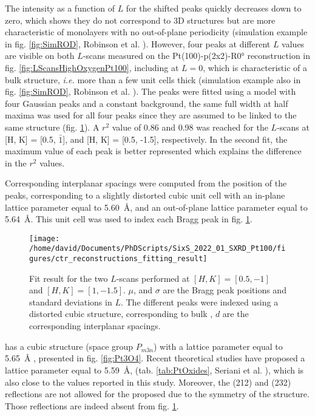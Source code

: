 The intensity as a function of $L$ for the shifted peaks quickly decreases down to zero, which shows they do not correspond to 3D structures but are more characteristic of monolayers with no out-of-plane periodicity (simulation example in fig. \ref{fig:SimROD}, Robinson et al. \cite*{Robinson1991}).
However, four peaks at different $L$ values are visible on both $L$-scans measured on the Pt(100)-p(2x2)-R\ang{0} reconstruction in fig. \ref{fig:LScansHighOxygenPt100}, including at $L=0$, which is characteristic of a bulk structure, \textit{i.e.} more than a few unit cells thick (simulation example also in fig. \ref{fig:SimROD}, Robinson et al. \cite*{Robinson1991}).
The peaks were fitted using a model with four Gaussian peaks and a constant background, the same full width at half maxima was used for all four peaks since they are assumed to be linked to the same structure (fig. \ref{fig:FitPt100LScans}).
A $r^2$ value of \num{0.86} and \num{0.98} was reached for the $L$-scans at [H, K] = [0.5, $\bar{1}$], and [H, K] = [0.5, -1.5], respectively.
In the second fit, the maximum value of each peak is better represented which explains the difference in the $r^2$ values.

Corresponding interplanar spacings were computed from the position of the peaks, corresponding to a slightly distorted cubic unit cell with an in-plane lattice parameter equal to \qty{5.60}{\angstrom}, and an out-of-plane lattice parameter equal to \qty{5.64}{\angstrom}.
This unit cell was used to index each Bragg peak in fig. \ref{fig:FitPt100LScans}.

\begin{figure}[!htb]
    \centering
    \texttt{[image: /home/david/Documents/PhDScripts/SixS\_2022\_01\_SXRD\_Pt100/figures/ctr\_reconstructions\_fitting\_result]}
    \caption{
        Fit result for the two $L$-scans performed at $[H, K] = [0.5, -1]$ and $[H, K] = [1, -1.5]$.
        $\mu$, and $\sigma$ are the Bragg peak positions and standard deviations in $L$.
        The different peaks were indexed using a distorted cubic structure, corresponding to bulk , $d$ are the corresponding interplanar spacings.
    }
    \label{fig:FitPt100LScans}
\end{figure}

 has a cubic structure (space group $P_{m\bar{3}n}$) with a lattice parameter equal to \qty{5.65}{\angstrom} \parencite{Galloni1941, Galloni1952, Muller1968}, presented in fig. \ref{fig:Pt3O4}.
Recent theoretical studies have proposed a lattice parameter equal to \qty{5.59}{\angstrom}, (tab. \ref{tab:PtOxides}, Seriani et al. \cite*{Seriani2006}), which is also close to the values reported in this study.
Moreover, the (212) and (232) reflections are not allowed for the proposed due to the symmetry of the  structure.
Those reflections are indeed absent from fig. \ref{fig:FitPt100LScans}.

